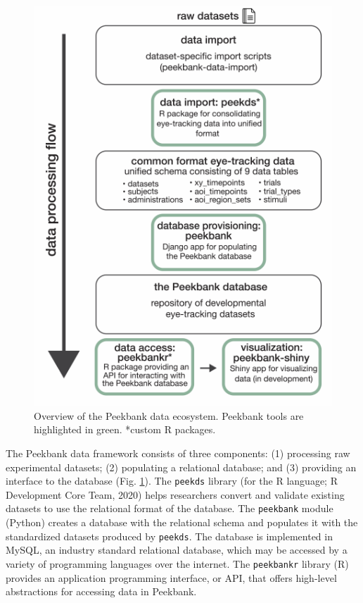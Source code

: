 \documentclass[10pt, letterpaper]{article}
\newenvironment{CodeChunk}{}{}
\begin{document}
\begin{CodeChunk}
\begin{figure}[tb]

{\centering \includegraphics{figs/fig_framework_overview-1} 

}

\caption[Overview of the Peekbank data ecosystem]{Overview of the Peekbank data ecosystem. Peekbank tools are highlighted in green. *custom R packages.}\label{fig:fig_framework_overview}
\end{figure}
\end{CodeChunk}

The Peekbank data framework consists of three components: (1) processing
raw experimental datasets; (2) populating a relational database; and (3)
providing an interface to the database (Fig.
\ref{fig:fig_framework_overview}). The \texttt{peekds} library (for the
R language; R Development Core Team, 2020) helps researchers convert and
validate existing datasets to use the relational format of the database.
The \texttt{peekbank} module (Python) creates a database with the
relational schema and populates it with the standardized datasets
produced by \texttt{peekds}. The database is implemented in MySQL, an
industry standard relational database, which may be accessed by a
variety of programming languages over the internet. The
\texttt{peekbankr} library (R) provides an application programming
interface, or API, that offers high-level abstractions for accessing
data in Peekbank.
\end{document}
